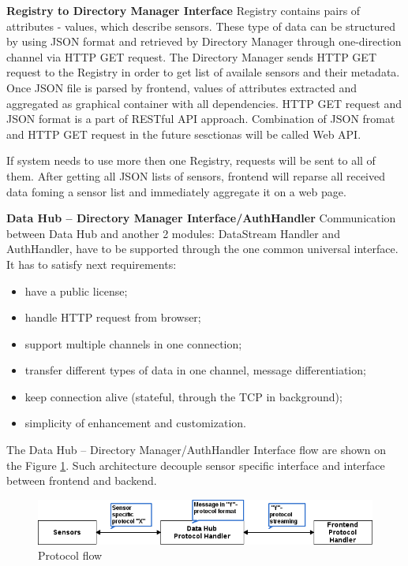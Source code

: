       \textbf{Registry to Directory Manager Interface}
      \newline
      Registry contains pairs of attributes - values, which describe sensors. These type of data can be structured by using JSON format and retrieved by Directory Manager through one-direction channel via HTTP GET request. The Directory Manager sends HTTP GET request to the Registry in order to get list of availale sensors and their metadata. Once JSON file is parsed by frontend, values of attributes extracted and aggregated as graphical container with all dependencies. HTTP GET request and JSON format is a part of RESTful API approach. Combination of JSON fromat and HTTP GET request in the future sesctionas will be called Web API.

      If system needs to use more then one Registry, requests will be sent to all of them. After getting all JSON lists of sensors, frontend will reparse all received data foming a sensor list and immediately aggregate it on a web page.

      \textbf{Data Hub -- Directory Manager Interface/AuthHandler}
      \newline
      Communication between Data Hub and another 2 modules: DataStream Handler and AuthHandler, have to be supported through the one common universal interface. It has to satisfy next requirements:
      \begin{itemize}
      \item have a public license;
      \item handle HTTP request from browser;
      \item support multiple channels in one connection;
      \item transfer different types of data in one channel, message differentiation;
      \item keep connection alive (stateful, through the TCP in background);
      \item simplicity of enhancement and customization.
      \end{itemize}

      The Data Hub -- Directory Manager/AuthHandler Interface flow are shown on the Figure \ref{img:protocol}. Such architecture decouple sensor specific interface and interface between frontend and backend.

      \begin{figure}[!ht]
      \centering
      \includegraphics[scale=0.6]{images/Protocol_flow.png}   
      \caption[Protocol flow]{Protocol flow}
      \label{img:protocol}                           
      \end{figure}

